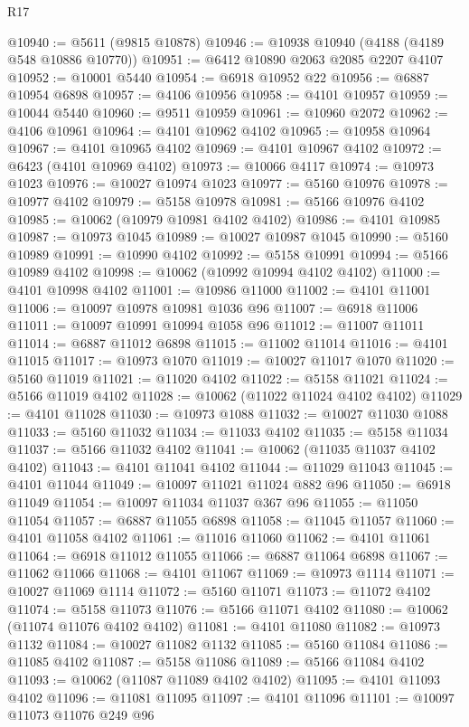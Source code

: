 \begin{lexlean}{R17}
\begin{coremodule}
@10940 := @5611 (@9815 @10878)
@10946 := @10938 @10940 (@4188 (@4189 @548 @10886 @10770))
@10951 := @6412 @10890 @2063 @2085 @2207 @4107
@10952 := @10001 @5440
@10954 := @6918 @10952 @22
@10956 := @6887 @10954 @6898
@10957 := @4106 @10956
@10958 := @4101 @10957
@10959 := @10044 @5440
@10960 := @9511 @10959
@10961 := @10960 @2072
@10962 := @4106 @10961
@10964 := @4101 @10962 @4102
@10965 := @10958 @10964
@10967 := @4101 @10965 @4102
@10969 := @4101 @10967 @4102
@10972 := @6423 (@4101 @10969 @4102)
@10973 := @10066 @4117
@10974 := @10973 @1023
@10976 := @10027 @10974 @1023
@10977 := @5160 @10976
@10978 := @10977 @4102
@10979 := @5158 @10978
@10981 := @5166 @10976 @4102
@10985 := @10062 (@10979 @10981 @4102 @4102)
@10986 := @4101 @10985
@10987 := @10973 @1045
@10989 := @10027 @10987 @1045
@10990 := @5160 @10989
@10991 := @10990 @4102
@10992 := @5158 @10991
@10994 := @5166 @10989 @4102
@10998 := @10062 (@10992 @10994 @4102 @4102)
@11000 := @4101 @10998 @4102
@11001 := @10986 @11000
@11002 := @4101 @11001
@11006 := @10097 @10978 @10981 @1036 @96
@11007 := @6918 @11006
@11011 := @10097 @10991 @10994 @1058 @96
@11012 := @11007 @11011
@11014 := @6887 @11012 @6898
@11015 := @11002 @11014
@11016 := @4101 @11015
@11017 := @10973 @1070
@11019 := @10027 @11017 @1070
@11020 := @5160 @11019
@11021 := @11020 @4102
@11022 := @5158 @11021
@11024 := @5166 @11019 @4102
@11028 := @10062 (@11022 @11024 @4102 @4102)
@11029 := @4101 @11028
@11030 := @10973 @1088
@11032 := @10027 @11030 @1088
@11033 := @5160 @11032
@11034 := @11033 @4102
@11035 := @5158 @11034
@11037 := @5166 @11032 @4102
@11041 := @10062 (@11035 @11037 @4102 @4102)
@11043 := @4101 @11041 @4102
@11044 := @11029 @11043
@11045 := @4101 @11044
@11049 := @10097 @11021 @11024 @882 @96
@11050 := @6918 @11049
@11054 := @10097 @11034 @11037 @367 @96
@11055 := @11050 @11054
@11057 := @6887 @11055 @6898
@11058 := @11045 @11057
@11060 := @4101 @11058 @4102
@11061 := @11016 @11060
@11062 := @4101 @11061
@11064 := @6918 @11012 @11055
@11066 := @6887 @11064 @6898
@11067 := @11062 @11066
@11068 := @4101 @11067
@11069 := @10973 @1114
@11071 := @10027 @11069 @1114
@11072 := @5160 @11071
@11073 := @11072 @4102
@11074 := @5158 @11073
@11076 := @5166 @11071 @4102
@11080 := @10062 (@11074 @11076 @4102 @4102)
@11081 := @4101 @11080
@11082 := @10973 @1132
@11084 := @10027 @11082 @1132
@11085 := @5160 @11084
@11086 := @11085 @4102
@11087 := @5158 @11086
@11089 := @5166 @11084 @4102
@11093 := @10062 (@11087 @11089 @4102 @4102)
@11095 := @4101 @11093 @4102
@11096 := @11081 @11095
@11097 := @4101 @11096
@11101 := @10097 @11073 @11076 @249 @96

\end{coremodule}
\end{lexlean}
